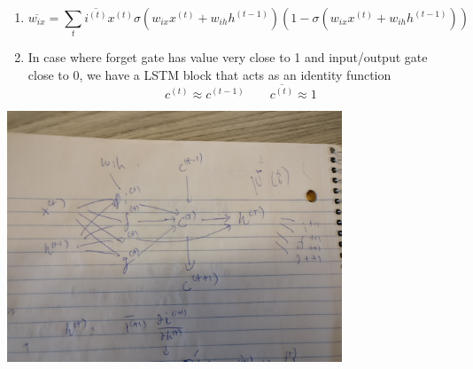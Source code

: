 \documentclass[11pt]{article}
\begin{document}
\begin{enumerate}
\begin{enumerate}
\item 
\[
	\overline{w_{ix}} = \sum_{t} \overline{i^{(t)}} x^{(t)} \sigma(w_{ix}x^{(t)} + w_{ih}h^{(t-1)}) (1 - \sigma(w_{ix}x^{(t)} + w_{ih}h^{(t-1)}))
\]
\item In case where forget gate has value very close to 1 and input/output gate close to 0, we have a LSTM block that acts as an identity function
\[
	c^{(t)} \approx c^{(t-1)}
    \qquad 
    \overline{c^{(t)}} \approx 1
\]

\end{enumerate}
\end{enumerate}


\begin{center}
    \includegraphics[width=10cm]{computation_graph.jpg}
\end{center}
\end{document}
